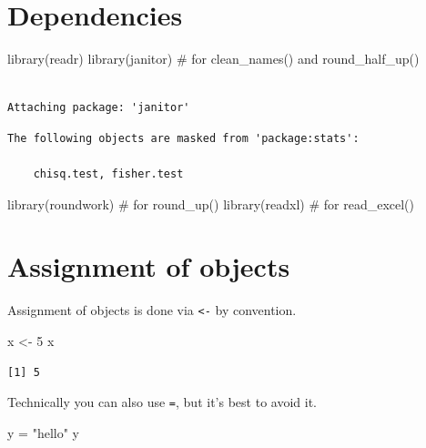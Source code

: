 \documentclass[
  letterpaper,
  DIV=11,
  numbers=noendperiod]{scrreprt}
\newenvironment{Shaded}{\begin{snugshade}}{\end{snugshade}}
\newcommand{\CommentTok}[1]{\textcolor[rgb]{0.37,0.37,0.37}{#1}}
\newcommand{\DecValTok}[1]{\textcolor[rgb]{0.68,0.00,0.00}{#1}}
\newcommand{\FunctionTok}[1]{\textcolor[rgb]{0.28,0.35,0.67}{#1}}
\newcommand{\NormalTok}[1]{\textcolor[rgb]{0.00,0.23,0.31}{#1}}
\newcommand{\OtherTok}[1]{\textcolor[rgb]{0.00,0.23,0.31}{#1}}
\newcommand{\StringTok}[1]{\textcolor[rgb]{0.13,0.47,0.30}{#1}}
\begin{document}
\section{Dependencies}\label{dependencies}

\begin{Shaded}
\begin{Highlighting}[]
\FunctionTok{library}\NormalTok{(readr)}
\FunctionTok{library}\NormalTok{(janitor) }\CommentTok{\# for clean\_names() and round\_half\_up()}
\end{Highlighting}
\end{Shaded}

\begin{verbatim}

Attaching package: 'janitor'
\end{verbatim}

\begin{verbatim}
The following objects are masked from 'package:stats':

    chisq.test, fisher.test
\end{verbatim}

\begin{Shaded}
\begin{Highlighting}[]
\FunctionTok{library}\NormalTok{(roundwork) }\CommentTok{\# for round\_up()}
\FunctionTok{library}\NormalTok{(readxl) }\CommentTok{\# for read\_excel()}
\end{Highlighting}
\end{Shaded}

\section{Assignment of objects}\label{assignment-of-objects}

Assignment of objects is done via \texttt{\textless{}-} by convention.

\begin{Shaded}
\begin{Highlighting}[]
\NormalTok{x }\OtherTok{\textless{}{-}} \DecValTok{5}
\NormalTok{x}
\end{Highlighting}
\end{Shaded}

\begin{verbatim}
[1] 5
\end{verbatim}

Technically you can also use \texttt{=}, but it's best to avoid it.

\begin{Shaded}
\begin{Highlighting}[]
\NormalTok{y }\OtherTok{=} \StringTok{"hello"}
\NormalTok{y}
\end{Highlighting}
\end{Shaded}
\end{document}
